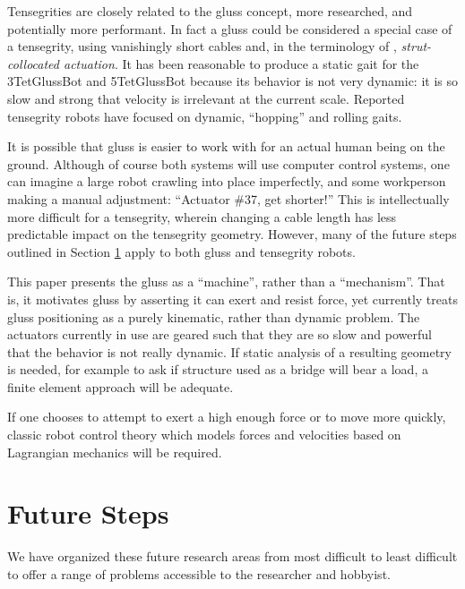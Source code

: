 \documentclass[11pt]{article}
\begin{document}
Tensegrities are closely related to the gluss concept, more researched, and potentially more performant.
In fact a gluss could be considered a special case of a tensegrity, using vanishingly short cables
and, in the terminology of \cite{paul2006}, \emph{strut-collocated actuation}.
It has been reasonable to produce a static gait for the 3TetGlussBot and 5TetGlussBot because its behavior is not
very dynamic: it is so slow and strong that velocity is irrelevant at the current scale.
Reported tensegrity robots have focused on dynamic, ``hopping'' and rolling gaits.

It is possible that gluss is easier to work with for an actual human being on the ground.
Although of course both systems will use computer control systems, one can imagine a large robot
crawling into place imperfectly, and some workperson making a manual adjustment: ``Actuator \#37, get shorter!''
This is intellectually more difficult for a tensegrity, wherein changing a cable length
has less predictable impact on the tensegrity geometry.
However, many
of the future steps outlined in Section \ref{futuresteps} apply to both gluss and tensegrity robots.

This paper presents the gluss as a ``machine'', rather than a ``mechanism''. That is, it motivates gluss
by asserting it can exert and resist force, yet currently treats gluss positioning as a purely kinematic,
rather than dynamic problem. The actuators currently in use are geared such that they are so slow
and powerful that the behavior is not really dynamic. If static analysis of a resulting geometry is
needed, for example to ask if structure used as a bridge will bear a load, a finite element approach\cite{géradin2001flexible} will be adequate.

If one chooses to attempt to exert a high enough force or to move more quickly, classic robot control theory
which models forces and velocities based on Lagrangian mechanics will be required.


\section{Future Steps}
\label{futuresteps}

We have organized these future research areas from most difficult to least
difficult to offer a range of problems accessible to the researcher and hobbyist.
\end{document}
